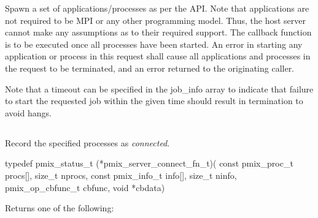 \optattrend

\descr

Spawn a set of applications/processes as per the  API.
Note that applications are not required to be \ac{MPI} or any other programming model.
Thus, the host server cannot make any assumptions as to their required support.
The callback function is to be executed once all processes have been started.
An error in starting any application or process in this request shall cause all applications and processes in the request to be terminated, and an error returned to the originating caller.

Note that a timeout can be specified in the job_info array to indicate that failure to start the requested job within the given time should result in termination to avoid hangs.


\subsection{}

\summary

Record the specified processes as \textit{connected}.

\format

\cspecificstart
\begin{codepar}
typedef pmix_status_t (*pmix_server_connect_fn_t)(
                             const pmix_proc_t procs[],
                             size_t nprocs,
                             const pmix_info_t info[],
                             size_t ninfo,
                             pmix_op_cbfunc_t cbfunc,
                             void *cbdata)
\end{codepar}
\cspecificend

\begin{arglist}
\end{arglist}

Returns one of the following:

